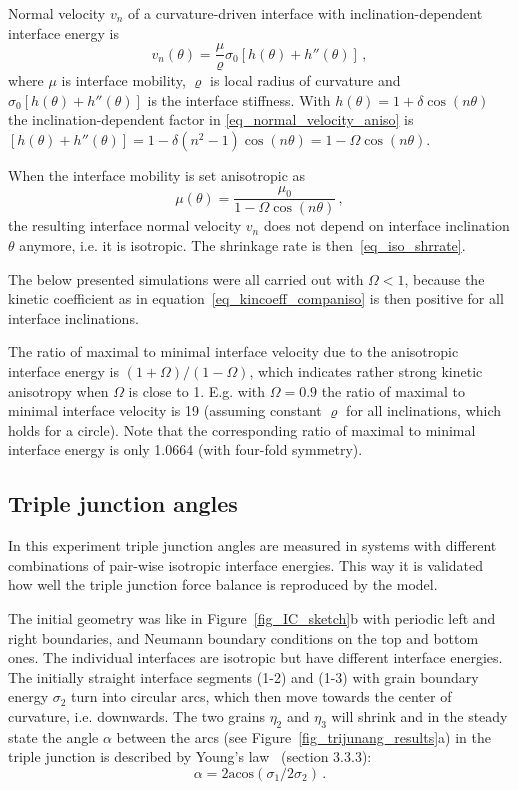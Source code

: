 Normal velocity $v_n$ of a curvature-driven interface with inclination-dependent interface energy is~\cite{Abdeljawad2018}
\begin{equation}\label{eq_normal_velocity_aniso}
	v_n(\theta) = \frac{\mu}{\varrho}  \sigma_0[h(\theta)+h''(\theta)]\,,
\end{equation}
where $\mu$ is interface mobility, $\varrho$ is local radius of curvature and $\sigma_0[h(\theta)+h''(\theta)]$ is the interface stiffness. With $h(\theta)=1+\delta\cos(n\theta)$ the inclination-dependent factor in \eqref{eq_normal_velocity_aniso} is $[h(\theta)+h''(\theta)] = 1 - \delta(n^2-1)\cos(n\theta) = 1-\Omega\cos(n\theta)$.

When the interface mobility is set anisotropic as
\begin{equation} \label{eq_kincoeff_companiso}
	\mu(\theta) = \frac{\mu_0}{1-\Omega\cos(n\theta)} \,,
\end{equation}
the resulting interface normal velocity $v_n$ does not depend on interface inclination $\theta$ anymore, i.e. it is isotropic. The shrinkage rate is then~\eqref{eq_iso_shrrate}.

The below presented simulations were all carried out with $\Omega<1$, because the kinetic coefficient as in equation~\eqref{eq_kincoeff_companiso} is then positive for all interface inclinations. 

The ratio of maximal to minimal interface velocity due to the anisotropic interface energy is $(1+\Omega)/(1-\Omega)$, which indicates rather strong kinetic anisotropy when $\Omega$ is close to 1. E.g. with $\Omega=0.9$ the ratio of maximal to minimal interface velocity is 19 (assuming constant $\varrho$ for all inclinations, which holds for a circle). Note that the corresponding ratio of maximal to minimal interface energy is only 1.0664 (with four-fold symmetry).

\subsection{Triple junction angles}

In this experiment triple junction angles are measured in systems with different combinations of pair-wise isotropic interface energies. This way it is validated how well the triple junction force balance is reproduced by the model.

The initial geometry was like in Figure~\ref{fig_IC_sketch}b with periodic left and right boundaries, and Neumann boundary conditions on the top and bottom ones. The individual interfaces are isotropic but have different interface energies. The initially straight interface segments (1-2) and (1-3) with grain boundary energy $\sigma_2$ turn into circular arcs, which then move towards the center of curvature, i.e. downwards. The two grains $\eta_2$ and $\eta_3$ will shrink and in the steady state the angle $\alpha$ between the arcs (see Figure~\ref{fig_trijunang_results}a) in the triple junction is described by Young's law~\cite{Porter2009} (section 3.3.3):
\begin{equation}
	\alpha = 2\mathrm{acos}(\sigma_{1}/2\sigma_{2}) \,.
\end{equation}

